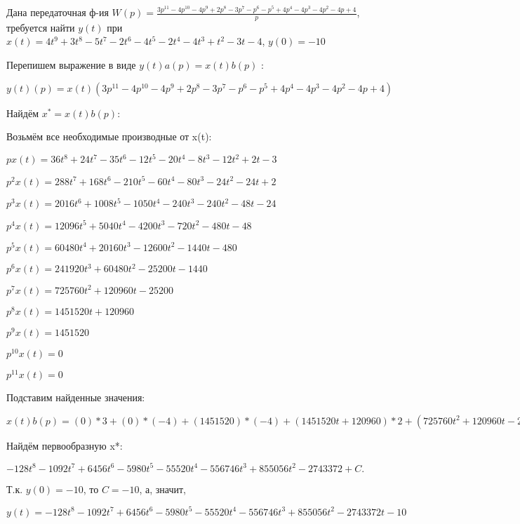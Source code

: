 \documentclass{article}
\begin{document}
{{{{{Дана передаточная ф-ия $W(p)=\frac{3p^{11}-4p^{10}-4p^{9}+2p^{8}-3p^{7}-p^{6}-p^{5}+4p^{4}-4p^{3}-4p^{2}-4p+4}{p}$, требуется найти $y(t)$ при $x(t)=4t^{9}+3t^{8}-5t^{7}-2t^{6}-4t^{5}-2t^{4}-4t^{3}+t^{2}-3t-4$, $y(0)=-10$

Перепишем выражение в виде $y(t)a(p)=x(t)b(p)$ :

$y(t)(p)=x(t)(3p^{11}-4p^{10}-4p^{9}+2p^{8}-3p^{7}-p^{6}-p^{5}+4p^{4}-4p^{3}-4p^{2}-4p+4)$

Найдём $x^*=x(t)b(p)$:

Возьмём все необходимые производные от x(t):

$px(t)=36t^{8}+24t^{7}-35t^{6}-12t^{5}-20t^{4}-8t^{3}-12t^{2}+2t-3$

$p^2x(t)=288t^{7}+168t^{6}-210t^{5}-60t^{4}-80t^{3}-24t^{2}-24t+2$

$p^3x(t)=2016t^{6}+1008t^{5}-1050t^{4}-240t^{3}-240t^{2}-48t-24$

$p^4x(t)=12096t^{5}+5040t^{4}-4200t^{3}-720t^{2}-480t-48$

$p^5x(t)=60480t^{4}+20160t^{3}-12600t^{2}-1440t-480$

$p^6x(t)=241920t^{3}+60480t^{2}-25200t-1440$

$p^7x(t)=725760t^{2}+120960t-25200$

$p^8x(t)=1451520t+120960$

$p^9x(t)=1451520$

$p^10x(t)=0$

$p^11x(t)=0$

Подставим найденные значения:

$x(t)b(p) = (0)*3+(0)*(-4)+(1451520)*(-4)+(1451520t+120960)*2+(725760t^{2}+120960t-25200)*(-3)+(241920t^{3}+60480t^{2}-25200t-1440)*(-1)+(60480t^{4}+20160t^{3}-12600t^{2}-1440t-480)*(-1)+(12096t^{5}+5040t^{4}-4200t^{3}-720t^{2}-480t-48)*4+(2016t^{6}+1008t^{5}-1050t^{4}-240t^{3}-240t^{2}-48t-24)*(-4)+(288t^{7}+168t^{6}-210t^{5}-60t^{4}-80t^{3}-24t^{2}-24t+2)*(-4)+(36t^{8}+24t^{7}-35t^{6}-12t^{5}-20t^{4}-8t^{3}-12t^{2}+2t-3)*(-4)+(36t^{8}+24t^{7}-35t^{6}-12t^{5}-20t^{4}-8t^{3}-12t^{2}+2t-3)*4=-1152t^{7}-8736t^{6}+45192t^{5}-35880t^{4}-277600t^{3}-2226984t^{2}+2565168t$





Найдём первообразную x*:

$-128t^{8}-1092t^{7}+6456t^{6}-5980t^{5}-55520t^{4}-556746t^{3}+855056t^{2}-2743372+C.$

Т.к. $y(0)=-10$, то $C=-10$, а, значит, 

$y(t)=-128t^{8}-1092t^{7}+6456t^{6}-5980t^{5}-55520t^{4}-556746t^{3}+855056t^{2}-2743372t-10$

}}}}}
\end{document}

